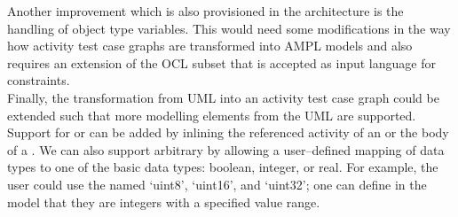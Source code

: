 Another improvement which is also provisioned in the architecture is the handling of object type variables. This would need some modifications in the way how activity test case graphs are transformed into AMPL models and also requires an extension of the OCL subset that is accepted as input language for constraints.\\
Finally, the transformation from UML into an activity test case graph could be extended such that more modelling elements from the UML are supported. Support for  or  can be added by inlining the referenced activity of an  or the body of a . We can also support arbitrary  by allowing a user--defined mapping of data types to one of the basic data types: boolean, integer, or real. For example, the user could use the  named `uint8', `uint16', and `uint32'; one can define in the model that they are integers with a specified value range.
